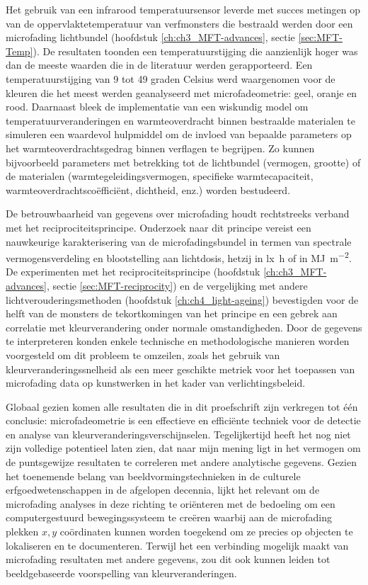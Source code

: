 Het gebruik van een infrarood temperatuursensor leverde met succes metingen op van de oppervlaktetemperatuur van verfmonsters die bestraald werden door een microfading lichtbundel (hoofdstuk \ref{ch:ch3_MFT-advances}, sectie \ref{sec:MFT-Temp}). De resultaten toonden een temperatuurstijging die aanzienlijk hoger was dan de meeste waarden die in de literatuur werden gerapporteerd. Een temperatuurstijging van 9 tot 49 graden Celsius werd waargenomen voor de kleuren die het meest werden geanalyseerd met microfadeometrie: geel, oranje en rood. Daarnaast bleek de implementatie van een wiskundig model om temperatuurveranderingen en warmteoverdracht binnen bestraalde materialen te simuleren een waardevol hulpmiddel om de invloed van bepaalde parameters op het warmteoverdrachtsgedrag binnen verflagen te begrijpen. Zo kunnen bijvoorbeeld parameters met betrekking tot de lichtbundel (vermogen, grootte) of de materialen (warmtegeleidingsvermogen, specifieke warmtecapaciteit, warmteoverdrachtscoëfficiënt, dichtheid, enz.) worden bestudeerd. 

De betrouwbaarheid van gegevens over microfading houdt rechtstreeks verband met het reciprociteitsprincipe. Onderzoek naar dit principe vereist een nauwkeurige karakterisering van de microfadingsbundel in termen van spectrale vermogensverdeling en blootstelling aan lichtdosis, hetzij in \unit{\lux\hour} of in \unit{\mega\joule\per\square\metre}. De experimenten met het reciprociteitsprincipe (hoofdstuk \ref{ch:ch3_MFT-advances}, sectie \ref{sec:MFT-reciprocity}) en de vergelijking met andere lichtverouderingsmethoden (hoofdstuk \ref{ch:ch4_light-ageing}) bevestigden voor de helft van de monsters de tekortkomingen van het principe en een gebrek aan correlatie met kleurverandering onder normale omstandigheden. Door de gegevens te interpreteren konden enkele technische en methodologische manieren worden voorgesteld om dit probleem te omzeilen, zoals het gebruik van kleurveranderingssnelheid als een meer geschikte metriek voor het toepassen van microfading data op kunstwerken in het kader van verlichtingsbeleid.

Globaal gezien komen alle resultaten die in dit proefschrift zijn verkregen tot één conclusie: microfadeometrie is een effectieve en efficiënte techniek voor de detectie en analyse van kleurveranderingsverschijnselen. Tegelijkertijd heeft het nog niet zijn volledige potentieel laten zien, dat naar mijn mening ligt in het vermogen om de puntsgewijze resultaten te correleren met andere analytische gegevens. Gezien het toenemende belang van beeldvormingstechnieken in de culturele erfgoedwetenschappen in de afgelopen decennia, lijkt het relevant om de microfading analyses in deze richting te oriënteren met de bedoeling om een computergestuurd bewegingssysteem te creëren waarbij aan de microfading plekken $x,y$ coördinaten kunnen worden toegekend om ze precies op objecten te lokaliseren en te documenteren. Terwijl het een verbinding mogelijk maakt van microfading resultaten met andere gegevens, zou dit ook kunnen leiden tot beeldgebaseerde voorspelling van kleurveranderingen.



